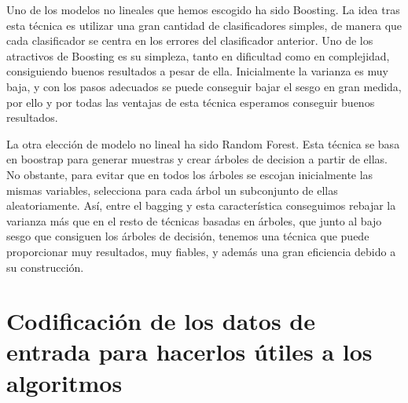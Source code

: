 \documentclass{article}
\begin{document}
	Uno de los modelos no lineales que hemos escogido ha sido Boosting. La idea tras esta técnica es utilizar una gran cantidad de clasificadores simples, de manera que cada clasificador se centra en los errores del clasificador anterior. Uno de los atractivos de Boosting es su simpleza, tanto en dificultad como en complejidad, consiguiendo buenos resultados a pesar de ella. Inicialmente la varianza es muy baja, y con los pasos adecuados se puede conseguir bajar el sesgo en gran medida, por ello y por todas las ventajas de esta técnica esperamos conseguir buenos resultados.
	
	La otra elección de modelo no lineal ha sido Random Forest. Esta técnica se basa en boostrap para generar muestras y crear árboles de decision a partir de ellas. No obstante, para evitar que en todos los árboles se escojan inicialmente las mismas variables, selecciona para cada árbol un subconjunto de ellas aleatoriamente. Así, entre el bagging y esta característica conseguimos rebajar la varianza más que en el resto de técnicas basadas en árboles, que junto al bajo sesgo que consiguen los árboles de decisión, tenemos una técnica que puede proporcionar muy resultados, muy fiables, y además una gran eficiencia debido a su construcción.
	
	\section{Codificación de los datos de entrada para hacerlos útiles a los algoritmos}
	
\end{document}
